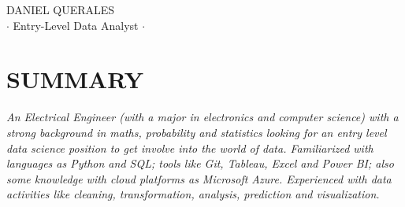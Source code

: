 \documentclass[10pt]{article} %
\def\myname{DANIEL QUERALES}
\def\position{$\cdot$ Entry-Level Data Analyst $\cdot$}
\begin{document}
\thispagestyle{empty}

\begin{center}
{\Huge \myname} \\ %
{\large \position}
\end{center}


\section*{SUMMARY}

\emph{An Electrical Engineer (with a major in electronics and computer science) with a strong background in maths, probability and statistics looking for an entry level data science position to get involve into the world of data. Familiarized with languages as Python and SQL; tools like Git, Tableau, Excel and Power BI; also some knowledge with cloud platforms as Microsoft Azure. Experienced with data activities like cleaning, transformation,  analysis, prediction and visualization.}



%
\end{document}

